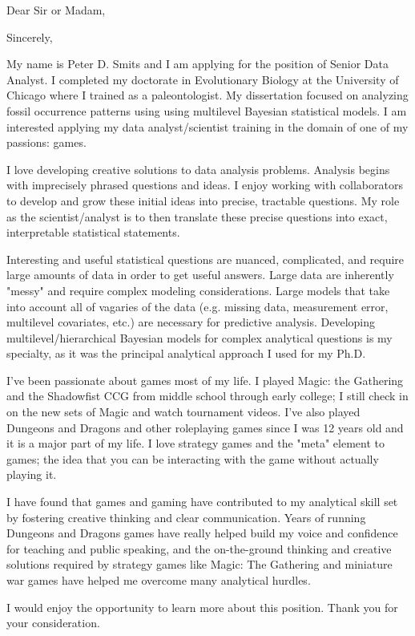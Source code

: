 \documentclass[11pt,a4paper,sans]{moderncv}        %
\begin{document}
\date{July 8, 2017}
\opening{Dear Sir or Madam,}
\closing{Sincerely,}
\makelettertitle

My name is Peter D. Smits and I am applying for the position of Senior Data Analyst. I completed my doctorate in Evolutionary Biology at the University of Chicago where I trained as a paleontologist. My dissertation focused on analyzing fossil occurrence patterns using using multilevel Bayesian statistical models. I am interested applying my data analyst/scientist training in the domain of one of my passions: games.

I love developing creative solutions to data analysis problems. Analysis begins with imprecisely phrased questions and ideas. I enjoy working with collaborators to develop and grow these initial ideas into precise, tractable questions. My role as the scientist/analyst is to then translate these precise questions into exact, interpretable statistical statements.

Interesting and useful statistical questions are nuanced, complicated, and require large amounts of data in order to get useful answers. Large data are inherently "messy" and require complex modeling considerations. Large models that take into account all of vagaries of the data (e.g. missing data, measurement error, multilevel covariates, etc.) are necessary for predictive analysis. Developing multilevel/hierarchical Bayesian models for complex analytical questions is my specialty, as it was the principal analytical approach I used for my Ph.D.

I've been passionate about games most of my life. I played Magic: the Gathering and the Shadowfist CCG from middle school through early college; I still check in on the new sets of Magic and watch tournament videos. I've also played Dungeons and Dragons and other roleplaying games since I was 12 years old and it is a major part of my life. I love strategy games and the "meta" element to games; the idea that you can be interacting with the game without actually playing it. 

I have found that games and gaming have contributed to my analytical skill set by fostering creative thinking and clear communication. Years of running Dungeons and Dragons games have really helped build my voice and confidence for teaching and public speaking, and the on-the-ground thinking and creative solutions required by strategy games like Magic: The Gathering and miniature war games have helped me overcome many analytical hurdles.

I would enjoy the opportunity to learn more about this position. Thank you for your consideration.


\makeletterclosing
\end{document}
